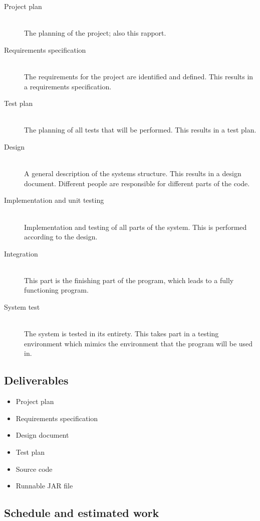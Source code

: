 \documentclass[12pt,titlepage]{article}
\begin{document}
\begin{description}
	\item[Project plan] \hfill \\
		The planning of the project; also this rapport.
	\item[Requirements specification] \hfill \\
		The requirements for the project are identified and defined.
		This results in a requirements specification.
	\item[Test plan] \hfill \\
		The planning of all tests that will be performed.
		This results in a test plan.
	\item[Design] \hfill \\
		A general description of the systems structure.
		This results in a design document.
		Different people are responsible for different parts of the
		code.
	\item[Implementation and unit testing] \hfill \\
		Implementation and testing of all parts of the system.
		This is performed according to the design.
	\item[Integration] \hfill \\
		This part is the finishing part of the program,
		which leads to a fully functioning program.
	\item[System test] \hfill \\
		The system is tested in its entirety. This takes part in a
		testing environment which mimics the environment that the
		program will be used in.
\end{description}

\subsection{Deliverables}

\begin{itemize}
	\item Project plan
	\item Requirements specification
	\item Design document
	\item Test plan
	\item Source code
	\item Runnable JAR file
\end{itemize}

\subsection{Schedule and estimated work}
\end{document}
